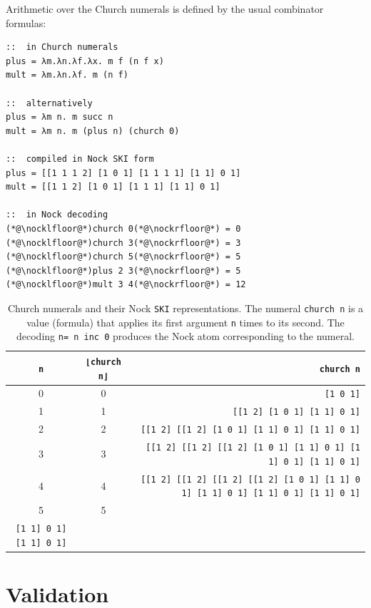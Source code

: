 \documentclass[twoside]{article}
\begin{document}
Arithmetic over the Church numerals is defined by the usual combinator formulas:

\begin{lstlisting}[style=listingblock]
::  in Church numerals
plus = λm.λn.λf.λx. m f (n f x)
mult = λm.λn.λf. m (n f)

::  alternatively
plus = λm n. m succ n
mult = λm n. m (plus n) (church 0)

::  compiled in Nock SKI form
plus = [[1 1 1 2] [1 0 1] [1 1 1 1] [1 1] 0 1]
mult = [[1 1 2] [1 0 1] [1 1 1] [1 1] 0 1]

::  in Nock decoding
(*@\nocklfloor@*)church 0(*@\nockrfloor@*) = 0
(*@\nocklfloor@*)church 3(*@\nockrfloor@*) = 3
(*@\nocklfloor@*)church 5(*@\nockrfloor@*) = 5
(*@\nocklfloor@*)plus 2 3(*@\nockrfloor@*) = 5
(*@\nocklfloor@*)mult 3 4(*@\nockrfloor@*) = 12
\end{lstlisting}

\begin{landscape}
\begin{table}
\caption{Church numerals and their Nock \texttt{SKI} representations.  The numeral \texttt{church n} is a value (formula) that applies its first argument \texttt{n} times to its second.  The decoding \texttt{\nocklfloor n\nockrfloor = n inc 0} produces the Nock atom corresponding to the numeral.}
\label{tbl:church-numerals}
\centering
\begin{tabular}{ccr}
\hline \hline
\texttt{n} & \texttt{⌊church n⌋} & \texttt{church n} \\
\hline
0 & 0 & \texttt{[1 0 1]} \\
1 & 1 & \texttt{[[1 2] [1 0 1] [1 1] 0 1]} \\
2 & 2 & \texttt{[[1 2] [[1 2] [1 0 1] [1 1] 0 1] [1 1] 0 1]} \\
3 & 3 & \texttt{[[1 2] [[1 2] [[1 2] [1 0 1] [1 1] 0 1] [1 1] 0 1] [1 1] 0 1]} \\
4 & 4 & \texttt{[[1 2] [[1 2] [[1 2] [[1 2] [1 0 1] [1 1] 0 1] [1 1] 0 1] [1 1] 0 1] [1 1] 0 1]} \\
5 & 5 & \makecell[r]{\texttt{[[1 2] [[1 2] [[1 2] [[1 2] [[1 2] [1 0 1][1 1] 0 1] [1 1] 0 1] [1 1] 0 1]} \\ \texttt{[1 1] 0 1] [1 1] 0 1]}} \\
\hline
\end{tabular}
\end{table}
\end{landscape}

\section{Validation}
\end{document}
